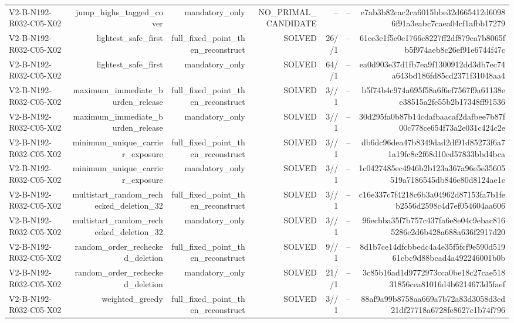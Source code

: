 {\begin{longtable}{lrrrrrr}
V2-B-N192-R032-C05-X02 & jump\_highs\_tagged\_cover & mandatory\_only & NO\_PRIMAL\_CANDIDATE & -- & -- & e7ab3b82cac2ca6015bbe32d665412d60986f91a3eabc7caea04cf1afbb17279 \\
V2-B-N192-R032-C05-X02 & lightest\_safe\_first & full\_fixed\_point\_then\_reconstruct & SOLVED & 26//1 & -- & 61ce3e1f5e0e1766c8227ff2df879ea7b8065fb5f974aeb8c26ef91e6744f47c \\
V2-B-N192-R032-C05-X02 & lightest\_safe\_first & mandatory\_only & SOLVED & 64//1 & -- & ea0d903e37d1fb7ea9f1300912dd3db7ec74a643bd186fd85cd2371f31048aa4 \\
V2-B-N192-R032-C05-X02 & maximum\_immediate\_burden\_release & full\_fixed\_point\_then\_reconstruct & SOLVED & 3//1 & -- & b5f74b4c974a695f58a6f6ef7567f9a61138ee38515a2fe55b2b17348ff91536 \\
V2-B-N192-R032-C05-X02 & maximum\_immediate\_burden\_release & mandatory\_only & SOLVED & 3//1 & -- & 30d295fa0b87b14cdafbaacaf2dafbee7b87f00c778ce654f73a2e031c424c2e \\
V2-B-N192-R032-C05-X02 & minimum\_unique\_carrier\_exposure & full\_fixed\_point\_then\_reconstruct & SOLVED & 3//1 & -- & db6dc96dea47b8349dad2df91d85273f6a71a19fc8c2f68d10cd57833bbd4bca \\
V2-B-N192-R032-C05-X02 & minimum\_unique\_carrier\_exposure & mandatory\_only & SOLVED & 3//1 & -- & 1c0427485ec4946b2b123a367a96e5e35605519a7186545db846e80d8124ae1c \\
V2-B-N192-R032-C05-X02 & multistart\_random\_rechecked\_deletion\_32 & full\_fixed\_point\_then\_reconstruct & SOLVED & 3//1 & -- & c16e337c7f4218c6b3a04962d87153fa7b1feb2556d2598c4d7ef054604aa606 \\
V2-B-N192-R032-C05-X02 & multistart\_random\_rechecked\_deletion\_32 & mandatory\_only & SOLVED & 3//1 & -- & 96ecbba35f7b757c437fa6e8e04c9ebac8165286e2d6b428a688a636f2917d20 \\
V2-B-N192-R032-C05-X02 & random\_order\_rechecked\_deletion & full\_fixed\_point\_then\_reconstruct & SOLVED & 9//1 & -- & 8d1b7ce14dfcbbedc4a4e35f5fcf9e590d51961cbc9d88bcad4a492246001b0b \\
V2-B-N192-R032-C05-X02 & random\_order\_rechecked\_deletion & mandatory\_only & SOLVED & 21//1 & -- & 3c85b16ad1d9772973cca0be18c27cae51831856cea81016d4b6214673d5faef \\
V2-B-N192-R032-C05-X02 & weighted\_greedy & full\_fixed\_point\_then\_reconstruct & SOLVED & 3//1 & -- & 88af9a99b8758aa669a7b72a83d3058d3cd21df27718a6728fe8627c1b74f796 \\

\end{longtable}}
